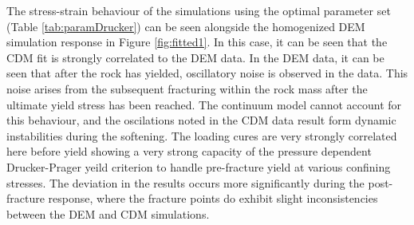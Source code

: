 The stress-strain behaviour of the simulations using the optimal parameter set (Table \ref{tab:paramDrucker}) can be seen alongside the homogenized DEM simulation response in Figure \ref{fig:fitted1}. In this case, it can be seen that the CDM fit is strongly correlated to the DEM data. In the DEM data, it can be seen that after the rock has yielded, oscillatory noise is observed in the data. This noise arises from the subsequent fracturing within the rock mass after the ultimate yield stress has been reached. The continuum model cannot account for this behaviour, and the oscilations noted in the CDM data result form dynamic instabilities during the softening. The loading cures are very strongly correlated here before yield showing a very strong capacity of the pressure dependent Drucker-Prager yeild criterion to handle pre-fracture yield at various confining stresses. The deviation in the results occurs more significantly during the post-fracture response, where the fracture points do exhibit slight inconsistencies between the DEM and CDM simulations. 